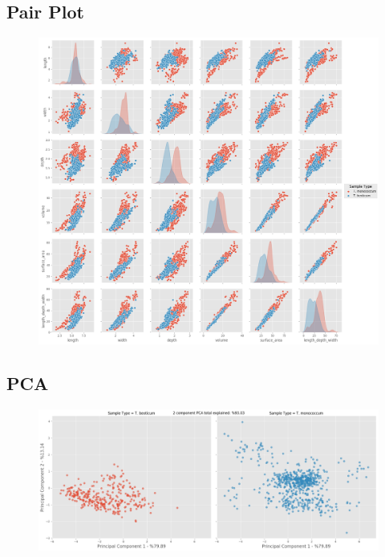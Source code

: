 \documentclass[11pt]{report}
\begin{document}
\subsection{Pair Plot}
\label{sec:org7bc3a15}

\begin{figure}[htbp]
\centering
\includegraphics[width=18cm]{./images/results/group1/pairplot.png}
\label{fig:org420c114}
\end{figure}

\clearpage
\subsection{PCA}
\label{sec:org7e38e9d}
\begin{figure}[htbp]
\centering
\includegraphics[width=18cm]{./images/results/group1/pca.png}
\label{fig:org39fff99}
\end{figure}
\end{document}
